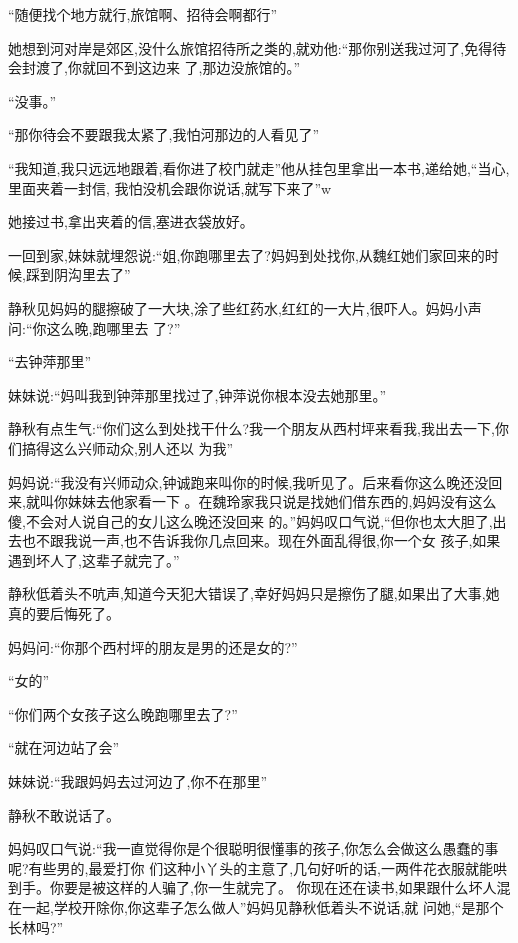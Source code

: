 ﻿\documentclass[12pt]{article}
\begin{document}
``随便找个地方就行,旅馆啊、招待会啊都行\myrule ''

她想到河对岸是郊区,没什么旅馆招待所之类的,就劝他:``那你别送我过河了,免得待会封渡了,你就回不到这边来
了,那边没旅馆的。''

``没事。''

``那你\myrule 待会不要跟我太紧了,我怕河那边的人看见了\myrule ''

``我知道,我只远远地跟着,看你进了校门就走\myrule ''他从挂包里拿出一本书,递给她,``当心,里面夹着一封信,
我怕没机会跟你说话,就写下来了\myrule ''w

她接过书,拿出夹着的信,塞进衣袋放好。

一回到家,妹妹就埋怨说:``姐,你跑哪里去了?妈妈到处找你,从魏红她们家回来的时候,踩到阴沟里去了\myrule ''

静秋见妈妈的腿擦破了一大块,涂了些红药水,红红的一大片,很吓人。妈妈小声问:``你\myrule 这么晚,跑哪里去
了?''

``去\myrule 钟萍那里\myrule ''

妹妹说:``妈叫我到钟萍那里找过了,钟萍说你根本没去她那里。''

静秋有点生气:``你们这么到处找干什么?我一个朋友从西村坪来看我,我出去一下,你们搞得这么兴师动众,别人还以
为我\myrule ''

妈妈说:``我没有兴师动众,钟诚跑来叫你的时候,我听见了。后来看你这么晚还没回来,就叫你妹妹去他家看一下
\myrule 。在魏玲家我只说是找她们借东西的\myrule ,妈妈没有这么傻,不会对人说自己的女儿这么晚还没回来
的。''妈妈叹口气说,``但你也太大胆了,出去也不跟我说一声,也不告诉我你几点回来。现在外面乱得很,你一个女
孩子,如果遇到坏人了\myrule ,这辈子就完了。''

静秋低着头不吭声,知道今天犯大错误了,幸好妈妈只是擦伤了腿,如果出了大事,她真的要后悔死了。

妈妈问:``你那个\myrule 西村坪的朋友是\myrule 男的还是女的?''

``女的\myrule ''

``你们两个女孩子这么晚跑哪里去了?''

``就在河边站了会\myrule ''

妹妹说:``我跟妈妈去过河边了,你不在那里\myrule ''

静秋不敢说话了。

妈妈叹口气说:``我一直觉得你是个很聪明很懂事的孩子\myrule ,你怎么会做这么愚蠢的事呢?有些男的,最爱打你
们这种小丫头的主意了,几句好听的话,一两件花衣服就能\myrule 哄到手。你要是被这样的人骗了,你一生就完了。
你现在还在读书,如果跟什么坏人混在一起,学校开除你,你这辈子怎么做人\myrule ''妈妈见静秋低着头不说话,就
问她,``是那个长林吗?''
\end{document}
